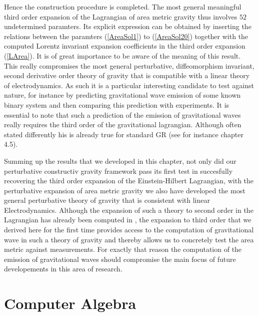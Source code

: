 \documentclass[a4paper,12pt, DIV=14, BCOR=5mm, twoside, headsepline]{scrbook}
\begin{document}
Hence the construction procedure is completed. The most general meaningful third order expansion of the Lagrangian of area metric gravity thus involves $52$ undetermined paramters. Its explicit expression can be obtained by inserting the relations between the paramters (\ref{AreaSol1}) to (\ref{AreaSol20}) together with the computed Lorentz invariant expansion coefficients in the third order expansion (\ref{LArea}). It is of great importance to be aware of the meaning of this result. This really compromises the most general perturbative, diffeomorphism invariant, second derivative order theory of gravity that is compatible with a linear theory of electrodynamics. As such it is a particular interesting candidate to test against nature, for instance by predicting gravitational wave emission of some known binary system and then comparing this prediction with experiments. It is essential to note that such a prediction of the emission of gravitational waves really requires the third order of the gravitational lagrangian. Although often stated differently his is already true for standard GR (see for instance \cite{1984grra.book.....S} chapter 4.5).

Summing up the results that we developed in this chapter, not only did our perturbative constructiv gravity framework pass its first test in succesfully recovering the third order expansion of the Einstein-Hilbert Lagrangian, with the perturbative expansion of area metric gravity we also have developed the most general perturbative theory of gravity that is consistent with linear Electrodynamics. Although the expansion of such a theory to second order in the Lagrangian has already been computed in \cite{2017arXiv170803870S}, the expansion to third order that we derived here for the first time provides access to the computation of gravitational wave in such a theory of gravity and thereby allows us to concretely test the area metric against measurements. For exactly that reason the computation of the emission of gravitational waves should compromise the main focus of future developements in this area of research. 

\chapter{Computer Algebra}\label{computerAlg}
\end{document}
